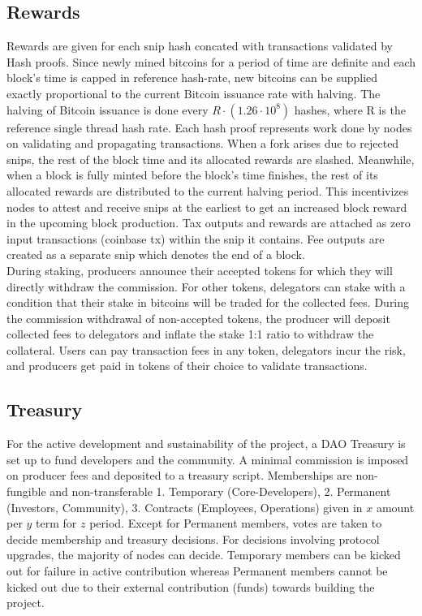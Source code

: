\documentclass[a4paper,	10pt]{extarticle}
\begin{document}
\subsection{Rewards}
Rewards are given for each snip hash concated with transactions validated by Hash proofs. Since newly mined bitcoins for a period of time are definite and each block's time is capped in reference hash-rate, new bitcoins can be supplied exactly proportional to the current Bitcoin issuance rate with halving. The halving of Bitcoin issuance is done every $R \cdot (1.26 \cdot 10^8)$ hashes, where R is the reference single thread hash rate. Each hash proof represents work done by nodes on validating and propagating transactions. When a fork arises due to rejected snips, the rest of the block time and its allocated rewards are slashed. Meanwhile, when a block is fully minted before the block's time finishes, the rest of its allocated rewards are distributed to the current halving period. This incentivizes nodes to attest and receive snips at the earliest to get an increased block reward in the upcoming block production. Tax outputs and rewards are attached as zero input transactions (coinbase tx) within the snip it contains. Fee outputs are created as a separate snip which denotes the end of a block.\\


During staking, producers announce their accepted tokens for which they will directly withdraw the commission. For other tokens, delegators can stake with a condition that their stake in bitcoins will be traded for the collected fees. During the commission withdrawal of non-accepted tokens, the producer will deposit collected fees to delegators and inflate the stake 1:1 ratio to withdraw the collateral. Users can pay transaction fees in any token, delegators incur the risk, and producers get paid in tokens of their choice to validate transactions.
\subsection{Treasury}
For the active development and sustainability of the project, a DAO Treasury is set up to fund developers and the community. A minimal commission is imposed on producer fees and deposited to a treasury script. Memberships are non-fungible and non-transferable 1. Temporary (Core-Developers), 2. Permanent (Investors, Community), 3. Contracts (Employees, Operations) given in $x$ amount per $y$ term for $z$ period. Except for Permanent members, votes are taken to decide membership and treasury decisions. For decisions involving protocol upgrades, the majority of nodes can decide. Temporary members can be kicked out for failure in active contribution whereas Permanent members cannot be kicked out due to their external contribution (funds) towards building the project.
\end{document}

